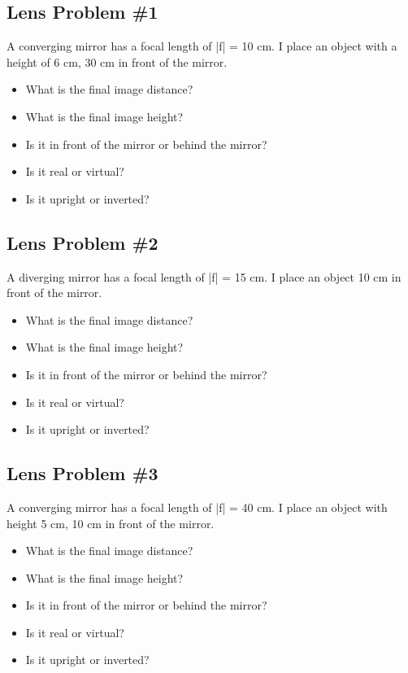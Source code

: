 \documentclass[11pt]{article}
\begin{document}
\subsection{Lens Problem \#1}
A converging mirror has a focal length of |f| = 10 cm.  I place an object with a height of 6 cm, 30 cm in front of the mirror.  

\begin{itemize}
\item What is the final image distance?
\item What is the final image height?
\item Is it in front of the mirror or behind the mirror?  
\item Is it real or virtual?
\item Is it upright or inverted?
\end{itemize}

\subsection{Lens Problem \#2}
A diverging mirror has a focal length of |f| = 15 cm.  I place an object 10 cm in front of the mirror.  

\begin{itemize}
\item What is the final image distance?
\item What is the final image height?
\item Is it in front of the mirror or behind the mirror?  
\item Is it real or virtual?
\item Is it upright or inverted?
\end{itemize}

\subsection{Lens Problem \#3}
A converging mirror has a focal length of |f| = 40 cm.  I place an object with height 5 cm, 10 cm in front of the mirror.  

\begin{itemize}
\item What is the final image distance?
\item What is the final image height?
\item Is it in front of the mirror or behind the mirror?  
\item Is it real or virtual?
\item Is it upright or inverted?
\end{itemize}
\end{document}
